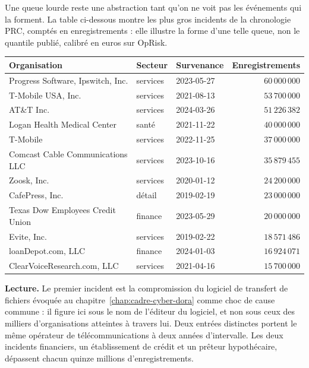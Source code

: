 Une queue lourde reste une abstraction tant qu'on ne voit pas les événements qui la forment.
La table ci-dessous montre les plus gros incidents de la chronologie PRC, comptés en
enregistrements : elle illustre la forme d'une telle queue, non le quantile publié, calibré en
euros sur OpRisk.

\begin{center}\footnotesize
\renewcommand{\arraystretch}{1.08}
\begin{tabular}{@{}l l l r@{}}
\toprule
\textbf{Organisation} & \textbf{Secteur} & \textbf{Survenance} &
\textbf{Enregistrements} \\
\midrule
Progress Software, Ipswitch, Inc.     & services & 2023-05-27 & $60\,000\,000$ \\
T-Mobile USA, Inc.                    & services & 2021-08-13 & $53\,700\,000$ \\
AT\&T Inc.                            & services & 2024-03-26 & $51\,226\,382$ \\
Logan Health Medical Center           & santé    & 2021-11-22 & $40\,000\,000$ \\
T-Mobile                              & services & 2022-11-25 & $37\,000\,000$ \\
Comcast Cable Communications LLC      & services & 2023-10-16 & $35\,879\,455$ \\
Zoosk, Inc.                           & services & 2020-01-12 & $24\,200\,000$ \\
CafePress, Inc.                       & détail   & 2019-02-19 & $23\,000\,000$ \\
Texas Dow Employees Credit Union      & finance  & 2023-05-29 & $20\,000\,000$ \\
Evite, Inc.                           & services & 2019-02-22 & $18\,571\,486$ \\
loanDepot.com, LLC                    & finance  & 2024-01-03 & $16\,924\,071$ \\
ClearVoiceResearch.com, LLC           & services & 2021-04-16 & $15\,700\,000$ \\
\bottomrule
\end{tabular}
\end{center}

\vspace{2pt}
\noindent\textbf{Lecture.} Le premier incident est la compromission du logiciel de transfert de
fichiers évoquée au chapitre~\ref{chap:cadre-cyber-dora} comme choc de cause commune : il figure
ici sous le nom de l'éditeur du logiciel, et non sous ceux des milliers d'organisations atteintes
à travers lui. Deux entrées distinctes portent le même opérateur de télécommunications à deux
années d'intervalle. Les deux incidents financiers, un établissement de crédit et un prêteur
hypothécaire, dépassent chacun quinze millions d'enregistrements.

